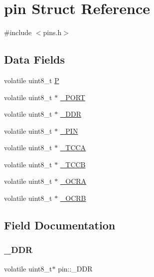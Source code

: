 \hypertarget{structpin}{}\section{pin Struct Reference}
\label{structpin}


{\ttfamily \#include $<$pins.\+h$>$}

\subsection*{Data Fields}
\begin{DoxyCompactItemize}
\item 
volatile uint8\+\_\+t \mbox{\hyperlink{structpin_a367c20491645205002483e3d3c94760f}{P}}
\item 
volatile uint8\+\_\+t $\ast$ \mbox{\hyperlink{structpin_a8533a7608dbc5287081146f6e013bc17}{\+\_\+\+P\+O\+RT}}
\item 
volatile uint8\+\_\+t $\ast$ \mbox{\hyperlink{structpin_a6bff1e5dc48e9042d2ea87c648f5ca5f}{\+\_\+\+D\+DR}}
\item 
volatile uint8\+\_\+t $\ast$ \mbox{\hyperlink{structpin_a49fe3709ef56c543cc6ecd056276e408}{\+\_\+\+P\+IN}}
\item 
volatile uint8\+\_\+t $\ast$ \mbox{\hyperlink{structpin_a811907019bb7d30bd612531e12518160}{\+\_\+\+T\+C\+CA}}
\item 
volatile uint8\+\_\+t $\ast$ \mbox{\hyperlink{structpin_a8974dff112d8e4cd0b878ff1cb5ff58a}{\+\_\+\+T\+C\+CB}}
\item 
volatile uint8\+\_\+t $\ast$ \mbox{\hyperlink{structpin_a9660f80910cc06291d95364142f0ee7b}{\+\_\+\+O\+C\+RA}}
\item 
volatile uint8\+\_\+t $\ast$ \mbox{\hyperlink{structpin_a1ca368f1e8e31ebd5087f687da43ef77}{\+\_\+\+O\+C\+RB}}
\end{DoxyCompactItemize}


\subsection{Field Documentation}
\mbox{\label{structpin_a6bff1e5dc48e9042d2ea87c648f5ca5f}} 
\subsubsection{\texorpdfstring{\+\_\+\+D\+DR}{\_DDR}}
{\footnotesize\ttfamily volatile uint8\+\_\+t$\ast$ pin\+::\+\_\+\+D\+DR}

